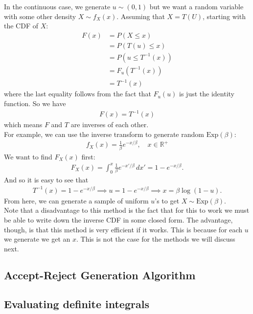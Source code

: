 \documentclass{book}
\theoremstyle{definition}
\newcommand{\nn}{\nonumber}
\newcommand{\f}[2]{\frac{#1}{#2}}
\begin{document}
In the continuous case, we generate $u \sim (0,1)$ but we want a random variable with some other density $X \sim f_X(x)$. Assuming that $X = T(U)$, starting with the CDF of $X$:
\begin{align}
F(x) &= P(X \leq x)\nn\\
&= P(T(u) \leq x)\nn\\
&= P(u \leq T^{-1}(x))\nn\\
&= F_u(T^{-1}(x))\nn\\
&= T^{-1}(x)
\end{align}
where the last equality follows from the fact that $F_u(u)$ is just the identity function. So we have
\begin{align}
\boxed{F(x) = T^{-1}(x)}
\end{align}
which means $F$ and $T$ are inverses of each other. \\

For example, we can use the inverse transform to generate random $\text{Exp}(\beta)$:
\begin{align}
f_X(x) = \f{1}{\beta}e^{-x/\beta}, \quad x\in \mathbb{R}^+
\end{align}
We want to find $F_X(x)$ first:
\begin{align}
F_X(x) = \int_0^x \f{1}{\beta} e^{-x'/\beta}\,dx' = 1 - e^{-x/\beta}.
\end{align}
And so it is easy to see that
\begin{align}
T^{-1}(x) = 1 - e^{-x/\beta} \implies u = 1 - e^{-x/\beta} \implies x = \beta \log(1-u).
\end{align}
From here, we can generate a sample of uniform $u$'s to get $X \sim \text{Exp}(\beta)$. \\

Note that a disadvantage to this method is the fact that for this to work we must be able to write down the inverse CDF in some closed form. The advantage, though, is that this method is very efficient if it works. This is because for each $u$ we generate we get an $x$. This is not the case for the methods we will discuss next. 



\subsection{Accept-Reject Generation Algorithm}

\subsection{Evaluating definite integrals}
\end{document}
